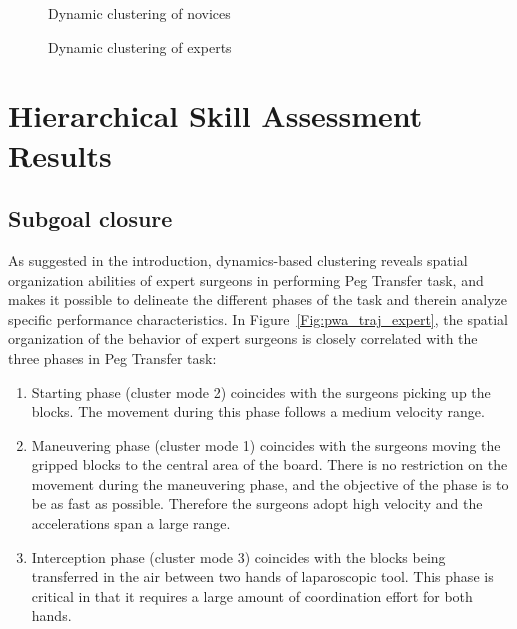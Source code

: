 \documentclass{llncs}
\begin{document}
\begin{figure}[th]
  \centering
  \begin{minipage}{.495\textwidth}
\centering
    \vspace{-0.6em}
    \caption{Dynamic clustering of novices}
    \label{Fig:pwa_novice}
  \end{minipage}
  \begin{minipage}{.495\textwidth}
    \centering
    \vspace{-0.6em}
    \caption{Dynamic clustering of experts}
    \label{Fig:pwa_expert}
  \end{minipage}
\end{figure}

\section{Hierarchical Skill Assessment Results}

\subsection{Subgoal closure}
As suggested in the introduction, dynamics-based clustering reveals spatial organization abilities of expert surgeons in performing Peg Transfer task, and makes it possible to delineate the different phases of the task and therein analyze specific performance characteristics. In Figure~\ref{Fig:pwa_traj_expert}, the spatial organization of the behavior of expert surgeons is closely correlated with the three phases in Peg Transfer task:
\begin{enumerate}
  \item Starting phase (cluster mode 2) coincides with the surgeons picking up the blocks. The movement during this phase follows a medium velocity range.
  \item Maneuvering phase (cluster mode 1) coincides with the surgeons moving the gripped blocks to the central area of the board. There is no restriction on the movement during the maneuvering phase, and the objective of the phase is to be as fast as possible. Therefore the surgeons adopt high velocity and the accelerations span a large range.
  \item Interception phase (cluster mode 3) coincides with the blocks being transferred in the air between two hands of laparoscopic tool. This phase is critical in that it
requires a large amount of coordination effort for both hands.
\end{enumerate}
\end{document}
